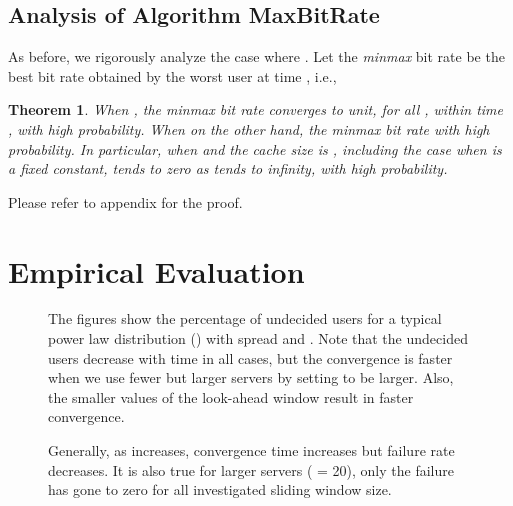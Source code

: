 \documentclass[conference]{IEEEtran}
\newtheorem{theorem}{Theorem}
\begin{document}
\subsection{Analysis of Algorithm MaxBitRate}
As before, we rigorously analyze the case where . Let the {\em minmax} bit rate  be the best bit rate obtained by the worst user at time , i.e., 

\begin{theorem}
\label{thm:bitrate}
When , the minmax bit rate converges to  unit, for all ,  within time , with high probability. When  on the other hand, the minmax bit rate  with high probability. In particular, when  and the cache size  is , including the case when  is a fixed constant,   tends to zero as  tends to infinity, with high probability. 
\end{theorem}
Please refer to appendix for the proof.

\section{Empirical Evaluation}
\label{sec:empirical}

\begin{figure*}[t]
  \centering
\begin{minipage}[b]{\textwidth}
  \caption{The figures show the percentage of undecided users for a typical power law distribution () with spread  and . Note that the undecided users decrease with time in all cases, but the convergence is faster when we use fewer but larger servers by setting  to be larger.   Also, the smaller values of the look-ahead window  result in faster convergence.}
\label{fig:assign}
\end{minipage}
\vspace{0.2in}
\begin{minipage}[b]{\textwidth}
  \centering
  \hspace{1.1in}
\caption{Generally, as  increases, convergence time increases but  failure rate decreases. It is also true for larger servers ( = 20), only the failure has gone to zero for all investigated sliding window size.}
\label{fig:tau}
\end{minipage}

\end{figure*}
\end{document}

